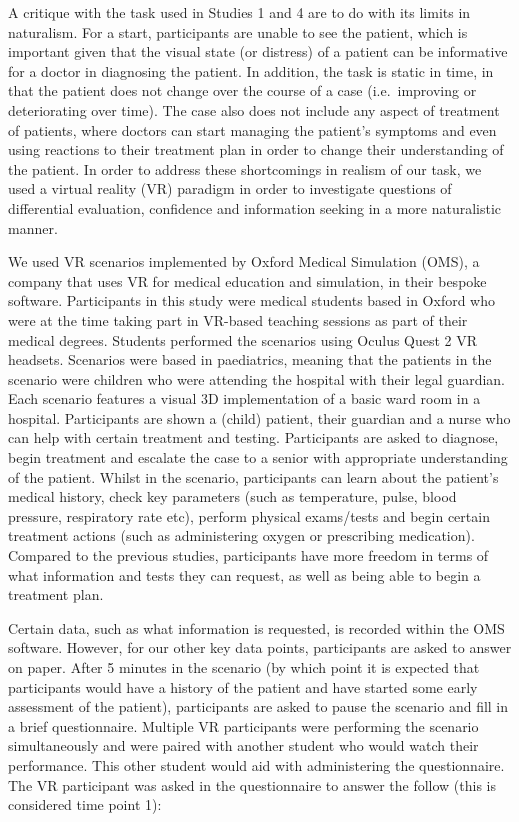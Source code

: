 \documentclass[a4paper, nobind]{templates/ociamthesis}
\begin{document}
A critique with the task used in Studies 1 and 4 are to do with its limits in naturalism. For a start, participants are unable to see the patient, which is important given that the visual state (or distress) of a patient can be informative for a doctor in diagnosing the patient. In addition, the task is static in time, in that the patient does not change over the course of a case (i.e.~improving or deteriorating over time). The case also does not include any aspect of treatment of patients, where doctors can start managing the patient's symptoms and even using reactions to their treatment plan in order to change their understanding of the patient. In order to address these shortcomings in realism of our task, we used a virtual reality (VR) paradigm in order to investigate questions of differential evaluation, confidence and information seeking in a more naturalistic manner.

We used VR scenarios implemented by Oxford Medical Simulation (OMS), a company that uses VR for medical education and simulation, in their bespoke software. Participants in this study were medical students based in Oxford who were at the time taking part in VR-based teaching sessions as part of their medical degrees. Students performed the scenarios using Oculus Quest 2 VR headsets. Scenarios were based in paediatrics, meaning that the patients in the scenario were children who were attending the hospital with their legal guardian. Each scenario features a visual 3D implementation of a basic ward room in a hospital. Participants are shown a (child) patient, their guardian and a nurse who can help with certain treatment and testing. Participants are asked to diagnose, begin treatment and escalate the case to a senior with appropriate understanding of the patient. Whilst in the scenario, participants can learn about the patient's medical history, check key parameters (such as temperature, pulse, blood pressure, respiratory rate etc), perform physical exams/tests and begin certain treatment actions (such as administering oxygen or prescribing medication). Compared to the previous studies, participants have more freedom in terms of what information and tests they can request, as well as being able to begin a treatment plan.

Certain data, such as what information is requested, is recorded within the OMS software. However, for our other key data points, participants are asked to answer on paper. After 5 minutes in the scenario (by which point it is expected that participants would have a history of the patient and have started some early assessment of the patient), participants are asked to pause the scenario and fill in a brief questionnaire. Multiple VR participants were performing the scenario simultaneously and were paired with another student who would watch their performance. This other student would aid with administering the questionnaire. The VR participant was asked in the questionnaire to answer the follow (this is considered time point 1):
\end{document}
